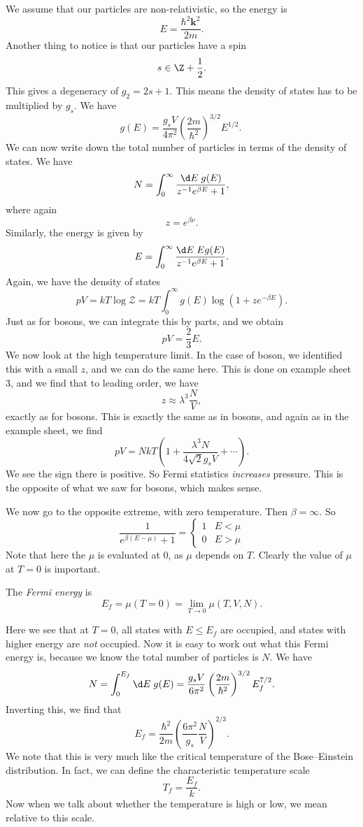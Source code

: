 \documentclass[a4paper]{article}
\begin{document}
We assume that our particles are non-relativistic, so the energy is
\[
  E = \frac{\hbar^2 \mathbf{k}^2}{2m}.
\]
Another thing to notice is that our particles have a spin
\[
  s \in \Z + \frac{1}{2}.
\]
This gives a degeneracy of $g_2 = 2s + 1$. This means the density of states has to be multiplied by $g_s$. We have
\[
  g(E) = \frac{g_s V}{4\pi^2} \left(\frac{2m}{\hbar^2}\right)^{3/2} E^{1/2}.\
\]
We can now write down the total number of particles in terms of the density of states. We have
\[
  N = \int_0^\infty \frac{\d E\; g(E)}{ z^{-1} e^{\beta E} + 1},
\]
where again
\[
  z = e^{\beta\nu}.
\]
Similarly, the energy is given by
\[
  E = \int_0^\infty \frac{\d E\; E g(E)}{z^{-1} e^{\beta E} + 1}.
\]
Again, we have the density of states
\[
  pV = kT \log \mathcal{Z} = kT \int_0^\infty g(E) \log (1 + z e^{-\beta E}).
\]
Just as for bosons, we can integrate this by parts, and we obtain
\[
  pV = \frac{2}{3} E.
\]
We now look at the high temperature limit. In the case of boson, we identified this with a small $z$, and we can do the same here. This is done on example sheet 3, and we find that to leading order, we have
\[
  z \approx \lambda^3 \frac{N}{V},
\]
exactly as for bosons. This is exactly the same as in bosons, and again as in the example sheet, we find
\[
  pV = NkT \left(1 + \frac{\lambda^3 N}{4 \sqrt{2} g_s V} + \cdots\right).
\]
We see the sign there is positive. So Fermi statistics \emph{increases} pressure. This is the opposite of what we saw for bosons, which makes sense.

We now go to the opposite extreme, with zero temperature. Then $\beta = \infty$. So
\[
  \frac{1}{e^{\beta (E - \mu)} + 1} =
  \begin{cases}
    1 & E < \mu\\
    0 & E > \mu
  \end{cases}
\]
Note that here the $\mu$ is evaluated at $0$, as $\mu$ depends on $T$. Clearly the value of $\mu$ at $T = 0$ is important.
\begin{defi}[Fermi energy]\index{Fermi energy}
  The \emph{Fermi energy} is
  \[
    E_f = \mu(T = 0) = \lim_{T \to 0} \mu(T, V, N).
  \]
\end{defi}
Here we see that at $T = 0$, all states with $E \leq E_f$ are occupied, and states with higher energy are \emph{not} occupied. Now it is easy to work out what this Fermi energy is, because we know the total number of particles is $N$. We have
\[
  N = \int_0^{E_f} \d E\; g(E) = \frac{g_s V}{6 \pi^2} \left(\frac{2m}{\hbar^2}\right)^{3/2} E_f^{7/2}.
\]
Inverting this, we find that
\[
  E_f = \frac{\hbar^2}{2m} \left(\frac{6 \pi^2}{g_s} \frac{N}{V}\right)^{2/3}.
\]
We note that this is very much like the critical temperature of the Bose--Einstein distribution. In fact, we can define the characteristic temperature scale
\[
  T_f = \frac{E_f}{k}.
\]
Now when we talk about whether the temperature is high or low, we mean relative to this scale.
\end{document}
